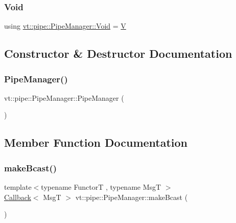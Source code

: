 \subsubsection{\texorpdfstring{Void}{Void}}
{\footnotesize\ttfamily using \hyperlink{structvt_1_1pipe_1_1_pipe_manager_ab720c2580ecfd3ab36e49aeaaff64cc6}{vt\+::pipe\+::\+Pipe\+Manager\+::\+Void} =  \hyperlink{structvt_1_1pipe_1_1_pipe_manager_t_l_a8d394521df58abfd90c1d81c998f22e3}{V}}



\subsection{Constructor \& Destructor Documentation}
\mbox{\label{structvt_1_1pipe_1_1_pipe_manager_aa2cf0e54dc146056c077aba1aa2ae42b}} 
\subsubsection{\texorpdfstring{Pipe\+Manager()}{PipeManager()}}
{\footnotesize\ttfamily vt\+::pipe\+::\+Pipe\+Manager\+::\+Pipe\+Manager (\begin{DoxyParamCaption}{ }\end{DoxyParamCaption})}



\subsection{Member Function Documentation}
\mbox{\label{structvt_1_1pipe_1_1_pipe_manager_a2ea6bd5ea3e001662681b1e5a1971e9d}} 
\subsubsection{\texorpdfstring{make\+Bcast()}{makeBcast()}\hspace{0.1cm}{\footnotesize\ttfamily [1/6]}}
{\footnotesize\ttfamily template$<$typename FunctorT , typename MsgT $>$ \\
\hyperlink{namespacevt_a36db99df4c973d48b1118a293fff533f}{Callback}$<$ MsgT $>$ vt\+::pipe\+::\+Pipe\+Manager\+::make\+Bcast (\begin{DoxyParamCaption}{ }\end{DoxyParamCaption})}

